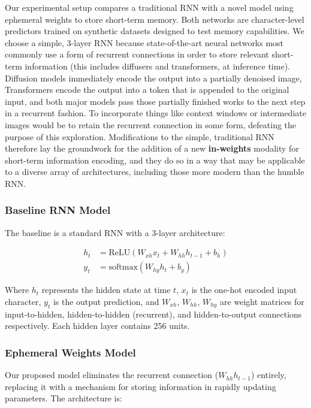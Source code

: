 Our experimental setup compares a traditional RNN with a novel model using ephemeral weights to store short-term memory. Both networks are character-level predictors trained on synthetic datasets designed to test memory capabilities. We choose a simple, 3-layer RNN because state-of-the-art neural networks most commonly use a form of recurrent connections in order to store relevant short-term information (this includes diffusers and transformers, at inference time). Diffusion models immediately encode the output into a partially denoised image, Transformers encode the output into a token that is appended to the original input, and both major models pass those partially finished works to the next step in a recurrent fashion. To incorporate things like context windows or intermediate images would be to retain the recurrent connection in some form, defeating the purpose of this exploration. Modifications to the simple, traditional RNN therefore lay the groundwork for the addition of a new \textbf{in-weights} modality for short-term information encoding, and they do so in a way that may be applicable to a diverse array of architectures, including those more modern than the humble RNN.


\subsubsection{Baseline RNN Model}

The baseline is a standard RNN with a 3-layer architecture:

\begin{align}
h_t &= \text{ReLU}(W_{xh}x_t + W_{hh}h_{t-1} + b_h)\\
y_t &= \text{softmax}(W_{hy}h_t + b_y)
\end{align}

Where $h_t$ represents the hidden state at time $t$, $x_t$ is the one-hot encoded input character, $y_t$ is the output prediction, and $W_{xh}$, $W_{hh}$, $W_{hy}$ are weight matrices for input-to-hidden, hidden-to-hidden (recurrent), and hidden-to-output connections respectively. Each hidden layer contains 256 units.

\subsubsection{Ephemeral Weights Model}

Our proposed model eliminates the recurrent connection ($W_{hh}h_{t-1}$) entirely, replacing it with a mechanism for storing information in rapidly updating parameters. The architecture is:

